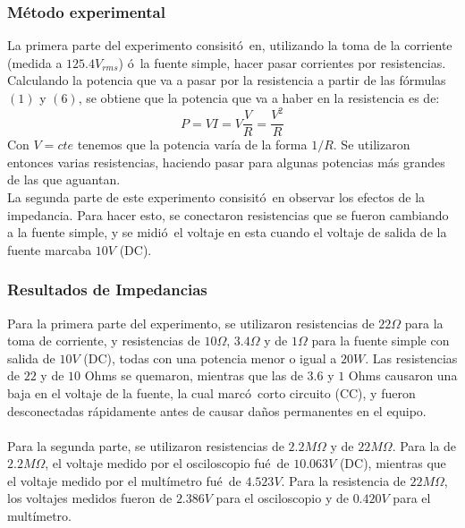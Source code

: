 \documentclass{article}
\begin{document}
\subsubsection{M\'etodo experimental}
La primera parte del experimento consisit\'o\ en, utilizando la toma de la corriente (medida a $125.4V_{rms}$) \'o\ la fuente simple, hacer pasar corrientes por resistencias. Calculando la potencia que va a pasar por la resistencia a partir de las f\'ormulas $(1)$ y $(6)$, se obtiene que la potencia que va a haber en la resistencia es de:
$$P=VI=V\frac{V}{R}=\frac{V^2}{R}$$
Con $V=cte$ tenemos que la potencia var\'ia de la forma $1/R$. Se utilizaron entonces varias resistencias, haciendo pasar para algunas potencias m\'as grandes de las que aguantan. \\
La segunda parte de este experimento consisit\'o\ en observar los efectos de la impedancia. Para hacer esto, se conectaron resistencias que se fueron cambiando a la fuente simple, y se midi\'o\ el voltaje en esta cuando el voltaje de salida de la fuente marcaba $10V$ (DC).

\subsubsection{Resultados de Impedancias}
Para la primera parte del experimento, se utilizaron resistencias de $22\Omega$ para la toma de corriente, y resistencias de $10\Omega$, $3.4\Omega$ y de $1\Omega$ para la fuente simple con salida de $10V$ (DC), todas con una potencia menor o igual a $20W$. Las resistencias de $22$ y de $10$ Ohms se quemaron, mientras que las de $3.6$ y $1$ Ohms causaron una baja en el voltaje de la fuente, la cual marc\'o\ corto circuito (CC), y fueron desconectadas r\'apidamente antes de causar da\~nos permanentes en el equipo. \\ \\
Para la segunda parte, se utilizaron resistencias de $2.2M\Omega$ y de $22M\Omega$. Para la de $2.2M\Omega$, el voltaje medido por el osciloscopio fu\'e\ de $10.063V$ (DC), mientras que el voltaje medido por el mult\'imetro fu\'e\ de $4.523V$. Para la resistencia de $22M\Omega$, los voltajes medidos fueron de $2.386V$ para el osciloscopio y de $0.420V$ para el mult\'imetro.
\end{document}

